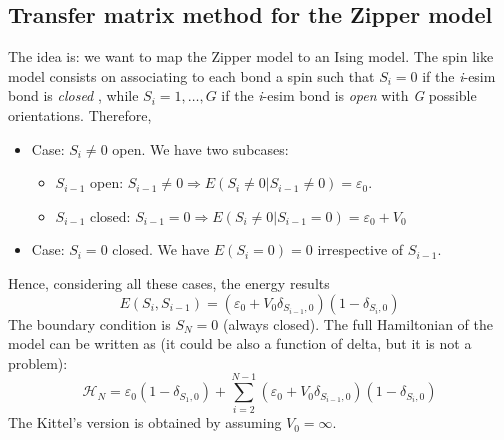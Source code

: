 \documentclass[../main/main.tex]{subfiles}
\begin{document}
\subsection{Transfer matrix method for the Zipper model}
The idea is: we want to map the Zipper model to an Ising model. The spin like model consists on associating to each bond a spin such that \( S_i = 0 \) if the \emph{i}-esim bond is \emph{closed} , while \( S_i = 1, \dots, G \) if the \emph{i}-esim bond is \emph{open} with \emph{G} possible orientations. Therefore,
\begin{itemize}
  \item Case: \( S_i \neq 0 \) open. We have two subcases:
  \begin{itemize}
  \item \( S_{i-1}\) open: \( S_{i-1} \neq 0 \Rightarrow E (S_i \neq 0 | S_{i-1} \neq 0) = \varepsilon _0\).
  \item \( S_{i-1}\) closed: \( S_{i-1} = 0 \Rightarrow  E (S_i \neq 0 | S_{i-1} = 0) = \varepsilon _0 + V_0 \)
  \end{itemize}
\item Case: \( S_i = 0 \) closed. We have \( E (S_i=0)=0 \) irrespective of \( S_{i-1} \).
\end{itemize}
Hence, considering all these cases, the energy results
\begin{equation}
  E ( S_i, S_{i-1}) = ( \varepsilon _0 + V_0 \delta _{S_{i-1},0}) (1- \delta _{S_i,0})
\end{equation}
The boundary condition is \( S_N =0 \) (always closed).
The full Hamiltonian of the model can be written as (it could be also a function of delta, but it is not a problem):
\begin{equation}
  \mathcal{H}_N = \varepsilon _0 (1- \delta _{S_1,0}) + \sum_{i=2}^{N-1} (\varepsilon _0 + V_0 \delta _{S_{i-1},0})(1- \delta _{S_i,0})
\end{equation}
The Kittel's version is obtained by assuming \( V_0 = \infty  \).
\end{document}
